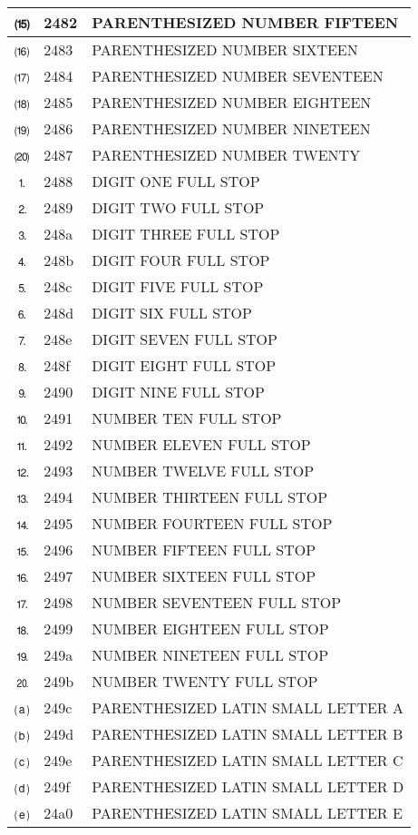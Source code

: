 \documentclass[12pt,letterpaper,openany]{book}
\begin{document}
\begin{center}
\begin{supertabular}{|m{0.25in}|m{0.5in}|m{4in}|}
⒂ & 2482 & PARENTHESIZED NUMBER FIFTEEN\\\hline
⒃ & 2483 & PARENTHESIZED NUMBER SIXTEEN\\\hline
⒄ & 2484 & PARENTHESIZED NUMBER SEVENTEEN\\\hline
⒅ & 2485 & PARENTHESIZED NUMBER EIGHTEEN\\\hline
⒆ & 2486 & PARENTHESIZED NUMBER NINETEEN\\\hline
⒇ & 2487 & PARENTHESIZED NUMBER TWENTY\\\hline
⒈ & 2488 & DIGIT ONE FULL STOP\\\hline
⒉ & 2489 & DIGIT TWO FULL STOP\\\hline
⒊ & 248a & DIGIT THREE FULL STOP\\\hline
⒋ & 248b & DIGIT FOUR FULL STOP\\\hline
⒌ & 248c & DIGIT FIVE FULL STOP\\\hline
⒍ & 248d & DIGIT SIX FULL STOP\\\hline
⒎ & 248e & DIGIT SEVEN FULL STOP\\\hline
⒏ & 248f & DIGIT EIGHT FULL STOP\\\hline
⒐ & 2490 & DIGIT NINE FULL STOP\\\hline
⒑ & 2491 & NUMBER TEN FULL STOP\\\hline
⒒ & 2492 & NUMBER ELEVEN FULL STOP\\\hline
⒓ & 2493 & NUMBER TWELVE FULL STOP\\\hline
⒔ & 2494 & NUMBER THIRTEEN FULL STOP\\\hline
⒕ & 2495 & NUMBER FOURTEEN FULL STOP\\\hline
⒖ & 2496 & NUMBER FIFTEEN FULL STOP\\\hline
⒗ & 2497 & NUMBER SIXTEEN FULL STOP\\\hline
⒘ & 2498 & NUMBER SEVENTEEN FULL STOP\\\hline
⒙ & 2499 & NUMBER EIGHTEEN FULL STOP\\\hline
⒚ & 249a & NUMBER NINETEEN FULL STOP\\\hline
⒛ & 249b & NUMBER TWENTY FULL STOP\\\hline
⒜ & 249c & PARENTHESIZED LATIN SMALL LETTER A\\\hline
⒝ & 249d & PARENTHESIZED LATIN SMALL LETTER B\\\hline
⒞ & 249e & PARENTHESIZED LATIN SMALL LETTER C\\\hline
⒟ & 249f & PARENTHESIZED LATIN SMALL LETTER D\\\hline
⒠ & 24a0 & PARENTHESIZED LATIN SMALL LETTER E\\\hline

\end{supertabular}
\end{center}
\end{document}
